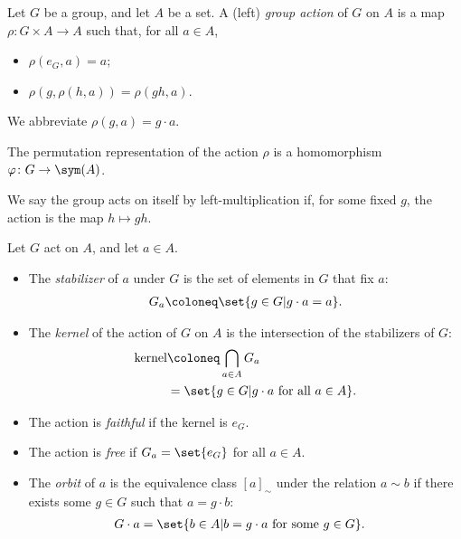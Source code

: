 \begin{definition}\label{def:group_action}
  Let $G$ be a group, and let $A$ be a set. A (left) \textit{group action} of $G$ on $A$ is a map $\rho\colon G\times A \rightarrow A$ such that, for all $a\in A$,
  \begin{itemize}
    \item $\rho\left(e_G,a\right) = a$;
    \item $\rho\left(g,\rho\left(h,a\right)\right) = \rho\left(gh,a\right)$.
  \end{itemize}
  We abbreviate $\rho\left(g,a\right) = g\cdot a$.\newline

  The permutation representation of the action $\rho$ is a homomorphism $\varphi\colon G\rightarrow \sym(A)$.\newline

  We say the group acts on itself by left-multiplication if, for some fixed $g$, the action is the map $h\mapsto gh$.
\end{definition}
\begin{definition}
  Let $G$ act on $A$, and let $a\in A$.
  \begin{itemize}
    \item The \textit{stabilizer} of $a$ under $G$ is the set of elements in $G$ that fix $a$:
      \begin{align*}
        G_{a} \coloneq \set{g\in G | g\cdot a = a}.
      \end{align*}
    \item The \textit{kernel} of the action of $G$ on $A$ is the intersection of the stabilizers of $G$:
      \begin{align*}
        \text{kernel} &\coloneq \bigcap_{a\in A}G_a\\
                      &= \set{g\in G | g\cdot a\text{ for all }a\in A}.
      \end{align*}
    \item The action is \textit{faithful} if the kernel is $e_G$.
    \item The action is \textit{free} if $G_a = \set{e_G}$ for all $a\in A$.
    \item The \textit{orbit} of $a$ is the equivalence class $\left[a\right]_{\sim}$ under the relation $a\sim b$ if there exists some $g\in G$ such that $a = g\cdot b$:
      \begin{align*}
        G\cdot a &= \set{b\in A | b = g\cdot a\text{ for some }g\in G}.
      \end{align*}
  \end{itemize}
\end{definition}
